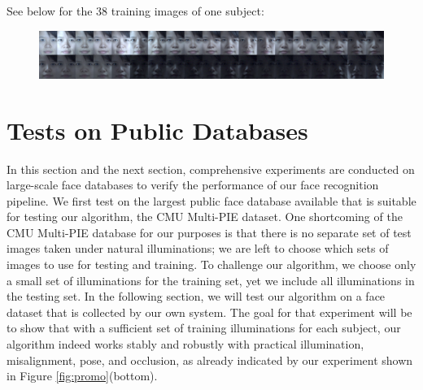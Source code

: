 See below for the 38 training images of one subject:
\begin{figure}[h]
\centering
\includegraphics[width=\textwidth]{figures_pami/training.png}
\end{figure}

\section{Tests on Public Databases}\label{sec:multipie}
In this section and the next section, comprehensive experiments are conducted on
large-scale face databases to verify the performance of our face recognition
pipeline.  
We first test on the largest public face database available that is
suitable for testing our algorithm, the CMU Multi-PIE dataset.  One shortcoming of the
CMU Multi-PIE database for our purposes is that there is no separate set of
test images taken under natural illuminations; we are left to choose which sets
of images to use for testing and training.  To challenge our algorithm, we
choose only a small set of illuminations for the training set, yet we include
all illuminations in the testing set. In the following section, we will test
our algorithm on a face dataset that is collected by our own system. The goal
for that experiment will be to show that with a sufficient set of training
illuminations for each subject, our algorithm indeed works stably and robustly
with practical illumination, misalignment, pose, and occlusion, as already
indicated by our experiment shown in Figure \ref{fig:promo}(bottom).


